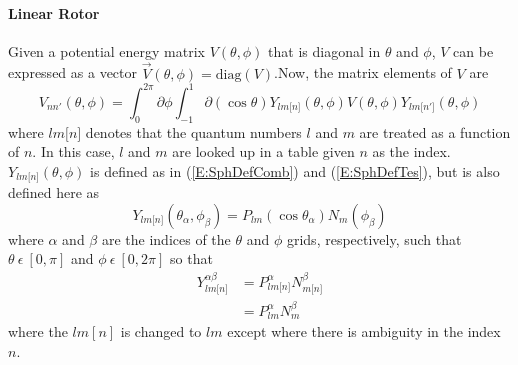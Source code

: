 \documentclass{revtex4-1}
\begin{document}
\paragraph{Linear Rotor}\label{S:PEOriLinRot}
Given a potential energy matrix $V(\theta,\phi)$ that is diagonal in $\theta$ and $\phi$, $V$ can be expressed as a vector $\vec{V}(\theta,\phi) = \mbox{diag}(V)$.Now, the matrix elements of $V$ are
\begin{equation}
V_{nn'}\left(\theta,\phi\right) = \int_{0}^{2\pi}\partial\phi\int_{-1}^{1}\partial\!\left(\cos{\theta}\right)Y_{lm\lbrack n\rbrack}\!\left(\theta,\phi\right)V\!\left(\theta,\phi\right)Y_{lm\lbrack n'\rbrack}\!\left(\theta,\phi\right)
\end{equation}
where $lm\lbrack n\rbrack$ denotes that the quantum numbers $l$ and $m$ are treated as a function of $n$. In this case, $l$ and $m$ are looked up in a table given $n$ as the index. $Y_{lm\lbrack n\rbrack}\!\left(\theta,\phi\right)$ is defined as in (\ref{E:SphDefComb}) and (\ref{E:SphDefTes}), but is also defined here as
\begin{equation}
Y_{lm\lbrack n\rbrack}(\theta_{\alpha},\phi_{\beta}) = P_{lm}(\cos{\theta_{\alpha}})N_{m}(\phi_{\beta})
\end{equation}
where $\alpha$ and $\beta$ are the indices of the $\theta$ and $\phi$ grids, respectively, such that $\theta\ \epsilon\ [0,\pi]$ and $\phi\ \epsilon\ [0, 2\pi]$ so that
\begin{align}
Y_{lm\lbrack n\rbrack}^{\alpha\beta} &= P_{lm\lbrack n\rbrack}^{\alpha}N_{m\lbrack n\rbrack}^{\beta}\\
									&= P_{lm}^{\alpha}N_{m}^{\beta}
\end{align}
where the $lm[n]$ is changed to $lm$ except where there is ambiguity in the index $n$.
\end{document}
